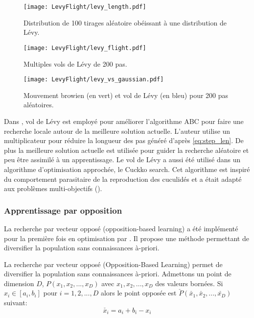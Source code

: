\begin{figure}
    \begin{center}
        \texttt{[image: LevyFlight/levy\_length.pdf]}
    \end{center}
    \caption{Distribution de 100 tirages aléatoire obéissant à une distribution de Lévy.
             \label{fig:levy_length}}
\end{figure}

\begin{figure}
    \begin{center}
        \texttt{[image: LevyFlight/levy\_flight.pdf]}
    \end{center}
    \caption{Multiples vols de Lévy de 200 pas.
             \label{fig:levy_flight}}
\end{figure}

\begin{figure}
    \begin{center}
        \texttt{[image: LevyFlight/levy\_vs\_gaussian.pdf]}
    \end{center}
    \caption{Mouvement browien (en vert) et vol de Lévy (en bleu) pour 200 pas aléatoires.
             \label{fig:levy_vs_gaussian}}
\end{figure}

Dans \cite{Sharma2012213}, vol de Lévy est employé pour améliorer l’algorithme ABC
pour faire une recherche locale autour de la meilleure solution actuelle. L’auteur
utilise un multiplicateur pour réduire la longueur des pas généré d’après \eqref{eq:step_len}.
De plus la meilleure solution actuelle est utilisée pour guider la recherche aléatoire et
peu être assimilé à un apprentissage. Le vol de Lévy a aussi été utilisé dans un algorithme
d’optimisation approchée, le Cuckko search. Cet algorithme est inspiré du comportement
parasitaire de la reproduction des cuculidés et a était adapté aux problèmes
multi-objectifs (\cite{Yang20131616}).

\subsubsection{Apprentissage par opposition} %
\label{ssub:apprentissage_par_opposition}

La recherche par vecteur opposé (opposition-based learning) a été implémenté pour la première fois
en optimisation par \cite{Tizhoosh2005695,Rahnamayan2008155}. Il propose une méthode permettant de diversifier la
population sans connaissances à-priori.
\begin{Def}\label{def:oblm}
La recherche par vecteur opposé (Opposition-Based Learning) permet de diversifier la
population sans connaissances à-priori.
Admettons un point de dimension $D$, $P(x_{1}, x_{2}, ..., x_{D})$ avec
$x_{1}, x_{2}, ..., x_{D}$ des valeurs bornées. Si $x_{i} \in [a_{i}, b_{i}]$ pour
$i = 1, 2, ..., D$ alors le point opposée est $\check{P}(\check{x_{1}}, \check{x_{2}}, ..., \check{x_{D}})$ suivant:
\[\check{x_{i}} = a_{i} + b_{i} - x_{i}\]
\end{Def}


